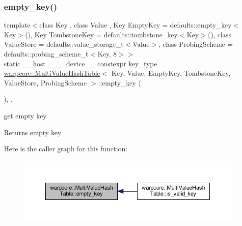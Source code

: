 \subsubsection{\texorpdfstring{empty\+\_\+key()}{empty\_key()}}
{\footnotesize\ttfamily template$<$class Key , class Value , Key Empty\+Key = defaults\+::empty\+\_\+key$<$\+Key$>$(), Key Tombstone\+Key = defaults\+::tombstone\+\_\+key$<$\+Key$>$(), class Value\+Store  = defaults\+::value\+\_\+storage\+\_\+t$<$\+Value$>$, class Probing\+Scheme  = defaults\+::probing\+\_\+scheme\+\_\+t$<$\+Key, 8$>$$>$ \\
static \+\_\+\+\_\+host\+\_\+\+\_\+\+\_\+\+\_\+device\+\_\+\+\_\+ constexpr key\+\_\+type \hyperlink{classwarpcore_1_1MultiValueHashTable}{warpcore\+::\+Multi\+Value\+Hash\+Table}$<$ Key, Value, Empty\+Key, Tombstone\+Key, Value\+Store, Probing\+Scheme $>$\+::empty\+\_\+key (\begin{DoxyParamCaption}{ }\end{DoxyParamCaption})\hspace{0.3cm}{\ttfamily [inline]}, {\ttfamily [static]}, {\ttfamily [noexcept]}}



get empty key 

\begin{DoxyReturn}{Returns}
empty key 
\end{DoxyReturn}
Here is the caller graph for this function\+:
\nopagebreak
\begin{figure}[H]
\begin{center}
\leavevmode
\includegraphics[width=350pt]{classwarpcore_1_1MultiValueHashTable_aefacf0aa968291b9965e302e835ea249_icgraph}
\end{center}
\end{figure}
\mbox{\label{classwarpcore_1_1MultiValueHashTable_aae24b5424491ad31fea85d1d909af6e9}} 
